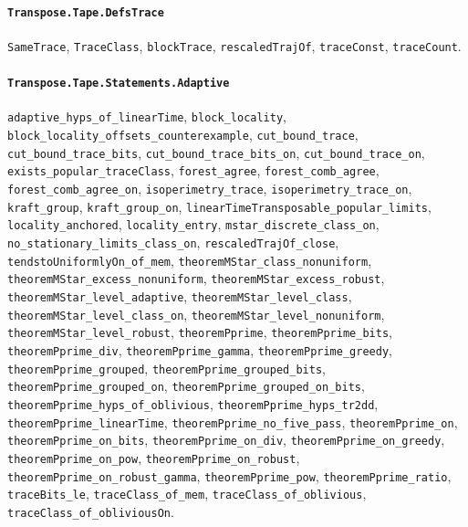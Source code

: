 \paragraph{\texttt{Transpose.Tape.DefsTrace}}
{\small\raggedright \texttt{SameTrace}, \texttt{TraceClass}, \texttt{blockTrace}, \texttt{rescaledTrajOf}, \texttt{traceConst}, \texttt{traceCount}.\par}

\paragraph{\texttt{Transpose.Tape.Statements.Adaptive}}
{\small\raggedright \texttt{adaptive\_hyps\_of\_linearTime}, \texttt{block\_locality}, \texttt{block\_locality\_offsets\_counterexample}, \texttt{cut\_bound\_trace}, \texttt{cut\_bound\_trace\_bits}, \texttt{cut\_bound\_trace\_bits\_on}, \texttt{cut\_bound\_trace\_on}, \texttt{exists\_popular\_traceClass}, \texttt{forest\_agree}, \texttt{forest\_comb\_agree}, \texttt{forest\_comb\_agree\_on}, \texttt{isoperimetry\_trace}, \texttt{isoperimetry\_trace\_on}, \texttt{kraft\_group}, \texttt{kraft\_group\_on}, \texttt{linearTimeTransposable\_popular\_limits}, \texttt{locality\_anchored}, \texttt{locality\_entry}, \texttt{mstar\_discrete\_class\_on}, \texttt{no\_stationary\_limits\_class\_on}, \texttt{rescaledTrajOf\_close}, \texttt{tendstoUniformlyOn\_of\_mem}, \texttt{theoremMStar\_class\_nonuniform}, \texttt{theoremMStar\_excess\_nonuniform}, \texttt{theoremMStar\_excess\_robust}, \texttt{theoremMStar\_level\_adaptive}, \texttt{theoremMStar\_level\_class}, \texttt{theoremMStar\_level\_class\_on}, \texttt{theoremMStar\_level\_nonuniform}, \texttt{theoremMStar\_level\_robust}, \texttt{theoremPprime}, \texttt{theoremPprime\_bits}, \texttt{theoremPprime\_div}, \texttt{theoremPprime\_gamma}, \texttt{theoremPprime\_greedy}, \texttt{theoremPprime\_grouped}, \texttt{theoremPprime\_grouped\_bits}, \texttt{theoremPprime\_grouped\_on}, \texttt{theoremPprime\_grouped\_on\_bits}, \texttt{theoremPprime\_hyps\_of\_oblivious}, \texttt{theoremPprime\_hyps\_tr2dd}, \texttt{theoremPprime\_linearTime}, \texttt{theoremPprime\_no\_five\_pass}, \texttt{theoremPprime\_on}, \texttt{theoremPprime\_on\_bits}, \texttt{theoremPprime\_on\_div}, \texttt{theoremPprime\_on\_greedy}, \texttt{theoremPprime\_on\_pow}, \texttt{theoremPprime\_on\_robust}, \texttt{theoremPprime\_on\_robust\_gamma}, \texttt{theoremPprime\_pow}, \texttt{theoremPprime\_ratio}, \texttt{traceBits\_le}, \texttt{traceClass\_of\_mem}, \texttt{traceClass\_of\_oblivious}, \texttt{traceClass\_of\_obliviousOn}.\par}

